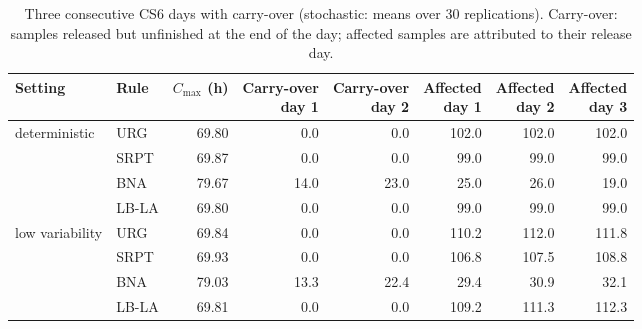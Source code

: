\begin{table}[tbp]
\caption{Three consecutive CS6 days with carry-over (stochastic: means over 30 replications). Carry-over: samples released but unfinished at the end of the day; affected samples are attributed to their release day.\label{tab:multiday}}
\centering
\footnotesize
\setlength{\tabcolsep}{3pt}
\begin{tabular*}{\textwidth}{@{\extracolsep{\fill}}llrrrrrr@{}}
\toprule
Setting & Rule & \shortstack{$C_{\max}$\\(h)} & \shortstack{Carry-over\\day 1} & \shortstack{Carry-over\\day 2} & \shortstack{Affected\\day 1} & \shortstack{Affected\\day 2} & \shortstack{Affected\\day 3}\\
\midrule
deterministic & URG & 69.80 & 0.0 & 0.0 & 102.0 & 102.0 & 102.0\\
 & SRPT & 69.87 & 0.0 & 0.0 & 99.0 & 99.0 & 99.0\\
 & BNA & 79.67 & 14.0 & 23.0 & 25.0 & 26.0 & 19.0\\
 & LB-LA & 69.80 & 0.0 & 0.0 & 99.0 & 99.0 & 99.0\\
low variability & URG & 69.84 & 0.0 & 0.0 & 110.2 & 112.0 & 111.8\\
 & SRPT & 69.93 & 0.0 & 0.0 & 106.8 & 107.5 & 108.8\\
 & BNA & 79.03 & 13.3 & 22.4 & 29.4 & 30.9 & 32.1\\
 & LB-LA & 69.81 & 0.0 & 0.0 & 109.2 & 111.3 & 112.3\\
\bottomrule
\end{tabular*}
\end{table}
